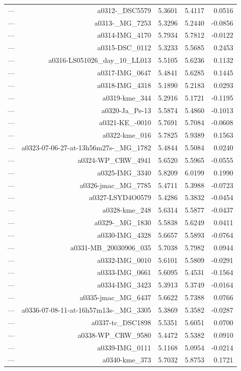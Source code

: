\begin{table}[htbp]
\begin{tabular}{lrrrr}
— & a0312-_DSC5579 & 5.3601 & 5.4117 & 0.0516 \\
— & a0313-_MG_7253 & 5.3296 & 5.2440 & -0.0856 \\
— & a0314-IMG_4170 & 5.7934 & 5.7812 & -0.0122 \\
— & a0315-DSC_0112 & 5.3233 & 5.5685 & 0.2453 \\
— & a0316-LS051026_day_10_LL013 & 5.5105 & 5.6236 & 0.1132 \\
— & a0317-IMG_0647 & 5.4841 & 5.6285 & 0.1445 \\
— & a0318-IMG_4318 & 5.1890 & 5.2183 & 0.0293 \\
— & a0319-kme_344 & 5.2916 & 5.1721 & -0.1195 \\
— & a0320-Ja_Pe-13 & 5.5874 & 5.4860 & -0.1013 \\
— & a0321-KE_-0010 & 5.7691 & 5.7084 & -0.0608 \\
— & a0322-kme_016 & 5.7825 & 5.9389 & 0.1563 \\
— & a0323-07-06-27-at-13h56m27s-_MG_1782 & 5.4844 & 5.5084 & 0.0240 \\
— & a0324-WP_CRW_4941 & 5.6520 & 5.5965 & -0.0555 \\
— & a0325-IMG_3340 & 5.8209 & 6.0199 & 0.1990 \\
— & a0326-jmac_MG_7785 & 5.4711 & 5.3988 & -0.0723 \\
— & a0327-LSYD4O0579 & 5.4286 & 5.3832 & -0.0454 \\
— & a0328-kme_248 & 5.6314 & 5.5877 & -0.0437 \\
— & a0329-_MG_1830 & 5.5838 & 5.6249 & 0.0411 \\
— & a0330-IMG_4328 & 5.6657 & 5.5893 & -0.0764 \\
— & a0331-MB_20030906_035 & 5.7038 & 5.7982 & 0.0944 \\
— & a0332-IMG_0010 & 5.6101 & 5.5809 & -0.0291 \\
— & a0333-IMG_0661 & 5.6095 & 5.4531 & -0.1564 \\
— & a0334-IMG_3423 & 5.3913 & 5.3749 & -0.0164 \\
— & a0335-jmac_MG_6437 & 5.6622 & 5.7388 & 0.0766 \\
— & a0336-07-08-11-at-16h57m13s-_MG_3305 & 5.3869 & 5.3582 & -0.0287 \\
— & a0337-tc_DSC1898 & 5.5351 & 5.6051 & 0.0700 \\
— & a0338-WP_CRW_9580 & 5.4472 & 5.5382 & 0.0910 \\
— & a0339-IMG_0111 & 5.1168 & 5.0954 & -0.0214 \\
— & a0340-kme_373 & 5.7032 & 5.8753 & 0.1721 \\

\end{tabular}
\end{table}

